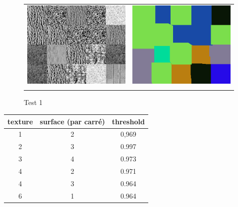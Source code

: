 \begin{figure}[htbp]
\centering
\begin{tabular}{cc}
\centering
\includegraphics[width=6cm,]{Figures/chap3/texture1.png}
&
\includegraphics[width=6cm,]{Figures/chap3/texture1c.png}\\
&
\end{tabular}
\caption[test1]{Test 1\\}
\end{figure}

\begin{center}
\begin{tabular}{ | c c c | }
	\hline                       
	texture & surface (par carré) & threshold\\
	\hline                       
	  1 & 2 & 0,969    \\
	  2 & 3 & 0.997  \\
	  3 & 4 & 0.973  \\
  	  4 & 2 & 0.971 \\
	  4 & 3 & 0.964\\
	  6 & 1 & 0.964 \\
	\hline                       
\end{tabular}
\end{center}


